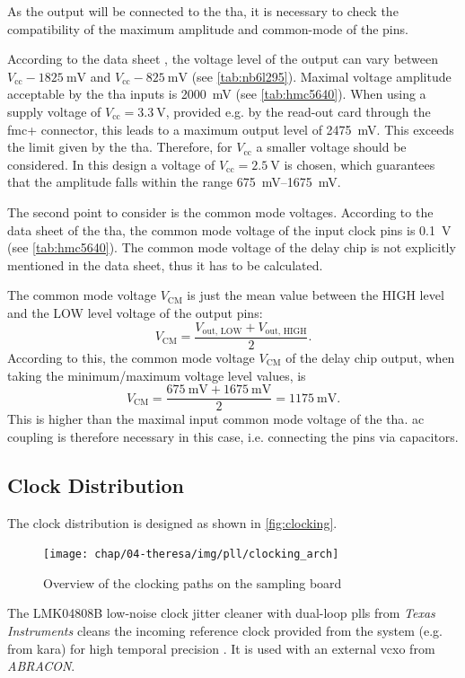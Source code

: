 As the output will be connected to the \gls{tha}, it is necessary to check the compatibility of the maximum amplitude and common-mode of the pins.

According to the data sheet \cite{NB6L295}, the voltage level of the output can vary between  $V_\text{cc} - \SI{1825}{\milli\volt}$ and $V_\text{cc} - \SI{825}{\milli\volt}$ (see \autoref{tab:nb6l295}).
Maximal voltage amplitude acceptable by the \gls{tha} inputs is \SI{2000}{\milli\volt} (see \autoref{tab:hmc5640}).
When using a supply voltage of $V_\text{cc} = \SI{3.3}{\volt}$, provided e.g. by the read-out card through the \gls{fmc}+ connector, this leads to a maximum output level of \SI{2475}{\milli\volt}.
This exceeds the limit given by the \gls{tha}.
Therefore, for $V_\text{cc}$ a smaller voltage should be considered.
In this design a voltage of $V_\text{cc} = \SI{2.5}{\volt}$ is chosen, which guarantees that the amplitude falls within the range \SIrange{675}{1675}{\milli\volt}.

The second point to consider is the common mode voltages. 
According to the data sheet of the \gls{tha}, the common mode voltage of the input clock pins is \SI{0.1}{\volt} (see \autoref{tab:hmc5640}).
The common mode voltage of the delay chip is not explicitly mentioned in the data sheet, thus it has to be calculated.

\clearpage
The common mode voltage $V_\text{CM}$ is just the mean value between the HIGH level and the LOW level voltage of the output pins:
\begin{equation}
	V_\text{CM} = \frac{V_\text{out, LOW} + V_\text{out, HIGH}}{2}.
\end{equation}
According to this, the common mode voltage $V_{\text{CM}}$ of the delay chip output, when taking the minimum/maximum voltage level values, is 
\begin{equation}
	V_\text{CM} = \frac{\SI{675}{\milli \volt} + \SI{1675}{\milli \volt}}{2} = \SI{1175}{\milli \volt}.
\end{equation}
This is higher than the maximal input common mode voltage of the \gls{tha}.
\gls{ac} coupling is therefore necessary in this case, i.e. connecting the pins via capacitors.

\subsection{Clock Distribution}
The clock distribution is designed as shown in \autoref{fig:clocking}.
\begin{figure}[tb]
	\centering
	\texttt{[image: chap/04-theresa/img/pll/clocking\_arch]}
	\caption{Overview of the clocking paths on the sampling board}
	\label{fig:clocking}
\end{figure}
The LMK04808B low-noise clock jitter cleaner with dual-loop \glspl{pll} from \textit{Texas Instruments} cleans the incoming reference clock provided from the system (e.g. from \gls{kara}) for high temporal precision \cite{caselle2013}.
It is used with an external \gls{vcxo} from \textit{ABRACON}. 

